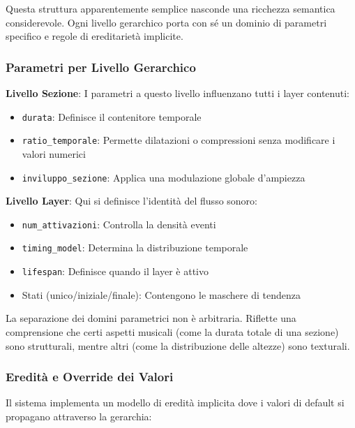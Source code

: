 Questa struttura apparentemente semplice nasconde una ricchezza semantica considerevole. Ogni livello gerarchico porta con sé un dominio di parametri specifico e regole di ereditarietà implicite.
\subsubsection{Parametri per Livello Gerarchico}
\textbf{Livello Sezione}: I parametri a questo livello influenzano tutti i layer contenuti:
\begin{itemize}
    \item \texttt{durata}: Definisce il contenitore temporale
    \item \texttt{ratio\_temporale}: Permette dilatazioni o compressioni senza modificare i valori numerici
    \item \texttt{inviluppo\_sezione}: Applica una modulazione globale d'ampiezza
\end{itemize}

\textbf{Livello Layer}: Qui si definisce l'identità del flusso sonoro:
\begin{itemize}
    \item \texttt{num\_attivazioni}: Controlla la densità eventi
    \item \texttt{timing\_model}: Determina la distribuzione temporale
    \item \texttt{lifespan}: Definisce quando il layer è attivo
    \item Stati (unico/iniziale/finale): Contengono le maschere di tendenza
\end{itemize}

La separazione dei domini parametrici non è arbitraria. Riflette una comprensione che certi aspetti musicali (come la durata totale di una sezione) sono strutturali, mentre altri (come la distribuzione delle altezze) sono texturali.
\subsubsection{Eredità e Override dei Valori}
Il sistema implementa un modello di eredità implicita dove i valori di default si propagano attraverso la gerarchia:

